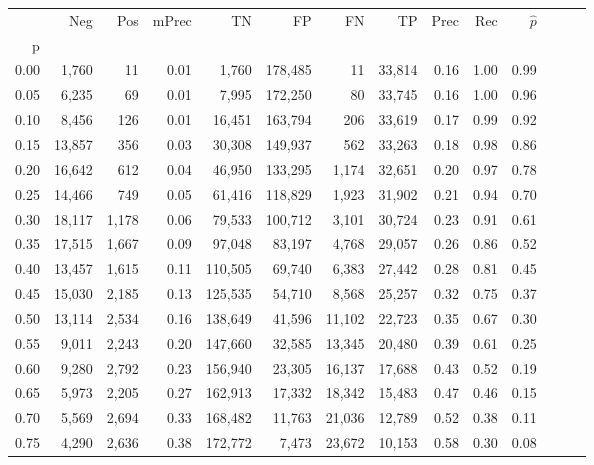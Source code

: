 \begin{tabular}{rrrrrrrrrrrrrr}
\toprule
{} &     Neg &    Pos & mPrec &       TN &       FP &      FN &      TP &  Prec &   Rec & $\hat{p}$ \\
p    &         &        &       &          &          &         &         &       &       &           \\
\midrule
0.00 &   1,760 &     11 &  0.01 &    1,760 &  178,485 &      11 &  33,814 &  0.16 &  1.00 &      0.99 \\
0.05 &   6,235 &     69 &  0.01 &    7,995 &  172,250 &      80 &  33,745 &  0.16 &  1.00 &      0.96 \\
0.10 &   8,456 &    126 &  0.01 &   16,451 &  163,794 &     206 &  33,619 &  0.17 &  0.99 &      0.92 \\
0.15 &  13,857 &    356 &  0.03 &   30,308 &  149,937 &     562 &  33,263 &  0.18 &  0.98 &      0.86 \\
0.20 &  16,642 &    612 &  0.04 &   46,950 &  133,295 &   1,174 &  32,651 &  0.20 &  0.97 &      0.78 \\
0.25 &  14,466 &    749 &  0.05 &   61,416 &  118,829 &   1,923 &  31,902 &  0.21 &  0.94 &      0.70 \\
0.30 &  18,117 &  1,178 &  0.06 &   79,533 &  100,712 &   3,101 &  30,724 &  0.23 &  0.91 &      0.61 \\
0.35 &  17,515 &  1,667 &  0.09 &   97,048 &   83,197 &   4,768 &  29,057 &  0.26 &  0.86 &      0.52 \\
0.40 &  13,457 &  1,615 &  0.11 &  110,505 &   69,740 &   6,383 &  27,442 &  0.28 &  0.81 &      0.45 \\
0.45 &  15,030 &  2,185 &  0.13 &  125,535 &   54,710 &   8,568 &  25,257 &  0.32 &  0.75 &      0.37 \\
0.50 &  13,114 &  2,534 &  0.16 &  138,649 &   41,596 &  11,102 &  22,723 &  0.35 &  0.67 &      0.30 \\
0.55 &   9,011 &  2,243 &  0.20 &  147,660 &   32,585 &  13,345 &  20,480 &  0.39 &  0.61 &      0.25 \\
0.60 &   9,280 &  2,792 &  0.23 &  156,940 &   23,305 &  16,137 &  17,688 &  0.43 &  0.52 &      0.19 \\
0.65 &   5,973 &  2,205 &  0.27 &  162,913 &   17,332 &  18,342 &  15,483 &  0.47 &  0.46 &      0.15 \\
0.70 &   5,569 &  2,694 &  0.33 &  168,482 &   11,763 &  21,036 &  12,789 &  0.52 &  0.38 &      0.11 \\
0.75 &   4,290 &  2,636 &  0.38 &  172,772 &    7,473 &  23,672 &  10,153 &  0.58 &  0.30 &      0.08 \\

\end{tabular}
